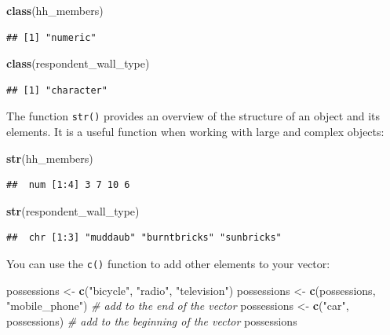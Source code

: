 \documentclass[]{book}
\newenvironment{Shaded}{\begin{snugshade}}{\end{snugshade}}
\newcommand{\KeywordTok}[1]{\textcolor[rgb]{0.13,0.29,0.53}{\textbf{#1}}}
\newcommand{\StringTok}[1]{\textcolor[rgb]{0.31,0.60,0.02}{#1}}
\newcommand{\CommentTok}[1]{\textcolor[rgb]{0.56,0.35,0.01}{\textit{#1}}}
\newcommand{\NormalTok}[1]{#1}
\begin{document}
\begin{Shaded}
\begin{Highlighting}[]
\KeywordTok{class}\NormalTok{(hh_members)}
\end{Highlighting}
\end{Shaded}

\begin{verbatim}
## [1] "numeric"
\end{verbatim}

\begin{Shaded}
\begin{Highlighting}[]
\KeywordTok{class}\NormalTok{(respondent_wall_type)}
\end{Highlighting}
\end{Shaded}

\begin{verbatim}
## [1] "character"
\end{verbatim}

The function \texttt{str()} provides an overview of the structure of an
object and its elements. It is a useful function when working with large
and complex objects:

\begin{Shaded}
\begin{Highlighting}[]
\KeywordTok{str}\NormalTok{(hh_members)}
\end{Highlighting}
\end{Shaded}

\begin{verbatim}
##  num [1:4] 3 7 10 6
\end{verbatim}

\begin{Shaded}
\begin{Highlighting}[]
\KeywordTok{str}\NormalTok{(respondent_wall_type)}
\end{Highlighting}
\end{Shaded}

\begin{verbatim}
##  chr [1:3] "muddaub" "burntbricks" "sunbricks"
\end{verbatim}

You can use the \texttt{c()} function to add other elements to your
vector:

\begin{Shaded}
\begin{Highlighting}[]
\NormalTok{possessions <-}\StringTok{ }\KeywordTok{c}\NormalTok{(}\StringTok{"bicycle"}\NormalTok{, }\StringTok{"radio"}\NormalTok{, }\StringTok{"television"}\NormalTok{)}
\NormalTok{possessions <-}\StringTok{ }\KeywordTok{c}\NormalTok{(possessions, }\StringTok{"mobile_phone"}\NormalTok{) }\CommentTok{# add to the end of the vector}
\NormalTok{possessions <-}\StringTok{ }\KeywordTok{c}\NormalTok{(}\StringTok{"car"}\NormalTok{, possessions) }\CommentTok{# add to the beginning of the vector}
\NormalTok{possessions}
\end{Highlighting}
\end{Shaded}
\end{document}
